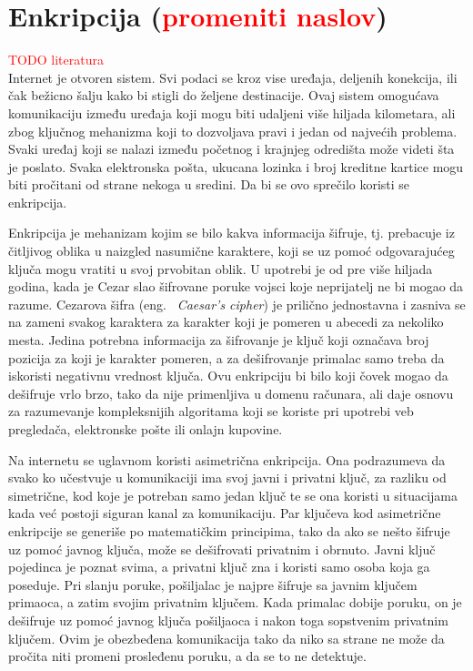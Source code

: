 \documentclass[a4paper]{article}
\newcommand\todos[1]{\textcolor{red}{#1}}
\begin{document}
\section{Enkripcija (\todos{promeniti naslov})} 
\todos{TODO literatura} \\
Internet je otvoren sistem. Svi podaci se kroz vise uređaja, deljenih konekcija, ili čak bežicno šalju kako bi stigli do željene destinacije. Ovaj sistem omogućava komunikaciju između uređaja koji mogu biti udaljeni više hiljada kilometara, ali zbog ključnog mehanizma koji to dozvoljava pravi i jedan od najvećih problema. Svaki uređaj koji se nalazi između početnog i krajnjeg  odredišta može videti šta je poslato. Svaka elektronska pošta, ukucana lozinka i broj kreditne kartice mogu biti pročitani od strane nekoga u sredini. Da bi se ovo sprečilo koristi se enkripcija.
\par Enkripcija je mehanizam kojim se bilo kakva informacija šifruje, tj. prebacuje iz čitljivog oblika u naizgled nasumične karaktere, koji se uz pomoć odgovarajućeg ključa mogu vratiti u svoj prvobitan oblik. U upotrebi je od pre više hiljada godina, kada je Cezar slao šifrovane poruke vojsci koje neprijatelj ne bi mogao da razume. Cezarova šifra (eng. ~{\em  Caesar's cipher}) je prilično jednostavna i zasniva se na zameni svakog karaktera za karakter koji je pomeren u abecedi za nekoliko mesta. Jedina potrebna informacija za šifrovanje je ključ koji označava broj pozicija za koji je karakter pomeren, a za dešifrovanje primalac samo treba da iskoristi negativnu vrednost ključa. Ovu enkripciju bi bilo koji čovek mogao da dešifruje vrlo brzo, tako da nije primenljiva u domenu računara, ali daje osnovu za razumevanje kompleksnijih algoritama koji se koriste pri upotrebi veb pregledača, elektronske pošte ili onlajn kupovine.
\par Na internetu se uglavnom koristi asimetrična enkripcija. Ona podrazumeva da svako ko učestvuje u komunikaciji ima svoj javni i privatni ključ, za razliku od simetrične, kod koje je potreban samo jedan ključ te se ona koristi u situacijama kada već postoji siguran kanal za komunikaciju. Par ključeva kod asimetrične enkripcije se generiše po matematičkim principima, tako da ako se nešto šifruje uz pomoć javnog ključa, može se dešifrovati privatnim i obrnuto. Javni ključ pojedinca je poznat svima, a privatni ključ zna i koristi samo osoba koja ga poseduje. Pri slanju poruke, pošiljalac je najpre šifruje sa javnim ključem primaoca, a zatim svojim privatnim ključem. Kada primalac dobije poruku, on je dešifruje uz pomoć javnog ključa pošiljaoca i nakon toga sopstvenim privatnim ključem. Ovim je obezbeđena komunikacija tako da niko sa strane ne može da pročita niti promeni prosleđenu poruku, a da se to ne detektuje.
\end{document}
